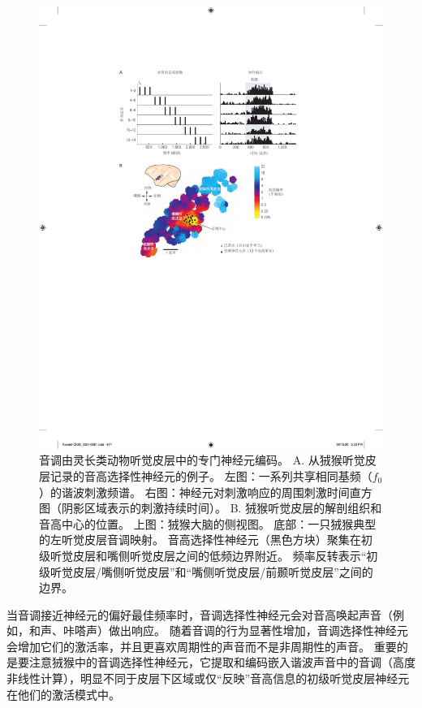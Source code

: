 \begin{figure}[htbp]
	\centering
	\includegraphics[width=0.85\linewidth]{chap28/fig_28_13}
	\caption{音调由灵长类动物听觉皮层中的专门神经元编码。
		A. 从狨猴听觉皮层记录的音高选择性神经元的例子。
		左图：一系列共享相同基频（$f_0$）的谐波刺激频谱。
		右图：神经元对刺激响应的周围刺激时间直方图（阴影区域表示的刺激持续时间）\cite{bendor2005neuronal}。
		B. 狨猴听觉皮层的解剖组织和音高中心的位置。
		上图：狨猴大脑的侧视图。
		底部：一只狨猴典型的左听觉皮层音调映射。
		音高选择性神经元（黑色方块）聚集在初级听觉皮层和嘴侧听觉皮层之间的低频边界附近。
		频率反转表示“初级听觉皮层/嘴侧听觉皮层”和“嘴侧听觉皮层/前颞听觉皮层”之间的边界\cite{bendor2005neuronal}。}
	\label{fig:28_13}
\end{figure}


当音调接近神经元的偏好最佳频率时，音调选择性神经元会对音高唤起声音（例如，和声、咔嗒声）做出响应。
随着音调的行为显著性增加，音调选择性神经元会增加它们的激活率，并且更喜欢周期性的声音而不是非周期性的声音。
重要的是要注意狨猴中的音调选择性神经元，它提取和编码嵌入谐波声音中的音调（高度非线性计算），明显不同于皮层下区域或仅“反映”音高信息的初级听觉皮层神经元在他们的激活模式中。


